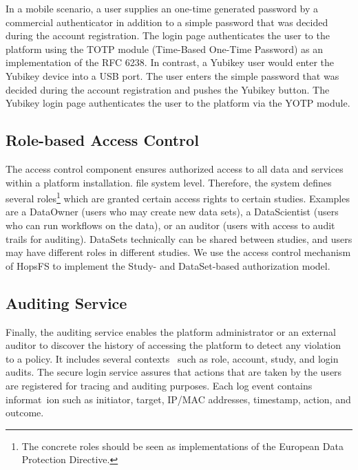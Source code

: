 In a mobile scenario, a user supplies an one-time generated password by a commercial authenticator in addition to a simple password that was decided during the account registration. The login page authenticates the user to the platform using the TOTP module (Time-Based One-Time Password) as an implementation of the RFC 6238.  In contrast, a Yubikey user would enter the Yubikey device into a USB port. The user enters the simple password that was decided during the account registration and pushes the Yubikey button. The Yubikey login page authenticates the user to the platform via the YOTP module.

\subsection {Role-based Access Control}

The access control component ensures authorized access to all data and services within a platform installation. file system level. Therefore, the system defines several roles\footnote{The concrete roles should be seen as implementations of the European Data Protection Directive.} which are granted certain access rights to certain studies. Examples are a DataOwner (users who may create new data sets), a DataScientist (users who can run workflows on the data), or an auditor (users with access to audit trails for auditing). DataSets technically can be shared between studies, and users may have different roles in different studies. We use the access control mechanism of HopsFS to implement the Study- and DataSet-based authorization model. 


\subsection {Auditing Service}
Finally, the auditing service enables the platform administrator or an external auditor to discover the history of accessing the platform to detect any violation to a policy. It includes several contexts \
such as role, account, study, and login audits. The secure login service assures that actions that are taken by the users are registered for tracing and auditing purposes. Each log event contains informat\
ion such as initiator, target, IP/MAC addresses, timestamp, action, and outcome.
